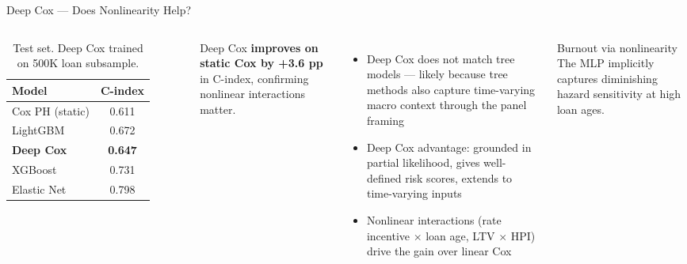 \documentclass[aspectratio=169]{beamer}
\begin{document}
\begin{frame}{Deep Cox — Does Nonlinearity Help?}
  \begin{columns}
      \begin{table}
        \small
        \begin{tabular}{lc}
          \toprule
          \textbf{Model} & \textbf{C-index} \\
          \midrule
          Cox PH (static)       & 0.611 \\
          LightGBM              & 0.672 \\
          \textbf{Deep Cox}     & \textbf{0.647} \\
          XGBoost               & 0.731 \\
          Elastic Net           & 0.798 \\
          \bottomrule
        \end{tabular}
        \caption{\small Test set. Deep Cox trained on 500K loan subsample.}
      \end{table}
      \vspace{0.3em}
      Deep Cox \textbf{improves on static Cox by +3.6 pp} in C-index,
      confirming nonlinear interactions matter.
      \begin{itemize}
        \item Deep Cox does not match tree models — likely because
          tree methods also capture time-varying macro context
          through the panel framing
        \item Deep Cox advantage: grounded in partial likelihood,
          gives well-defined risk scores, extends to time-varying inputs
        \item Nonlinear interactions (rate incentive $\times$ loan age,
          LTV $\times$ HPI) drive the gain over linear Cox
      \end{itemize}
      \begin{block}{Burnout via nonlinearity}
        The MLP implicitly captures diminishing hazard
        sensitivity at high loan ages.
      \end{block}
  \end{columns}
\end{frame}
\end{document}
